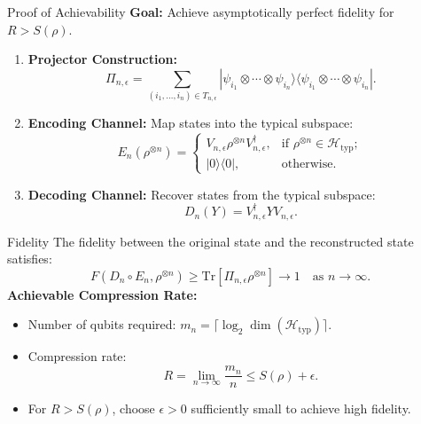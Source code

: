 \begin{frame}{Proof of Achievability}
    \textbf{Goal:} Achieve asymptotically perfect fidelity for \( R > S(\rho) \).
    \begin{enumerate}
        \item \textbf{Projector Construction:}
        \[
        \Pi_{n, \epsilon} = \sum_{(i_1, \dots, i_n) \in T_{n, \epsilon}} |\psi_{i_1} \otimes \cdots \otimes \psi_{i_n}\rangle \langle \psi_{i_1} \otimes \cdots \otimes \psi_{i_n}|.
        \]
        \item \textbf{Encoding Channel:} Map states into the typical subspace:
        \[
        E_n(\rho^{\otimes n}) = 
        \begin{cases}
            V_{n, \epsilon} \rho^{\otimes n} V_{n, \epsilon}^\dagger, & \text{if } \rho^{\otimes n} \in \mathcal{H}_{\text{typ}}; \\
            |0\rangle\langle 0|, & \text{otherwise.}
        \end{cases}
        \]
        \item \textbf{Decoding Channel:} Recover states from the typical subspace:
        \[
        D_n(Y) = V_{n, \epsilon}^\dagger Y V_{n, \epsilon}.
        \]
    \end{enumerate}
\end{frame}

\begin{frame}{Fidelity}
    The fidelity between the original state and the reconstructed state satisfies:
    \[
    F(D_n \circ E_n, \rho^{\otimes n}) \geq \text{Tr}[\Pi_{n, \epsilon} \rho^{\otimes n}] \to 1 \quad \text{as } n \to \infty.
    \]
    \textbf{Achievable Compression Rate:}
    \begin{itemize}
        \item Number of qubits required: \( m_n = \lceil \log_2 \dim(\mathcal{H}_{\text{typ}}) \rceil \).
        \item Compression rate:
        \[
        R = \lim_{n \to \infty} \frac{m_n}{n} \leq S(\rho) + \epsilon.
        \]
        \item For \( R > S(\rho) \), choose \( \epsilon > 0 \) sufficiently small to achieve high fidelity.
    \end{itemize}
\end{frame}

